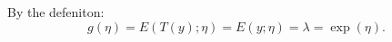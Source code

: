 \begin{answer}
By the defeniton:
\begin{equation*}
g(\eta) = E(T(y);\eta) = E(y; \eta) = \lambda = \exp(\eta).
\end{equation*}

\end{answer}
